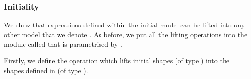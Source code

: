 \subsubsection{Initiality\label{sec:initiality}}
We show that expressions defined within the initial model can be lifted into
any other model that we denote . As before, we put all the lifting
operations into the module called  that is parametrised by .

Firstly, we define the operation  which lifts initial shapes (of type
) into the shapes defined in  (of type ).
\begin{AgdaSuppressSpace}
\begin{code}%
\>[0]\AgdaSpace{}%
\AgdaSpace{}%
\AgdaSymbol{(}\AgdaSpace{}%
\AgdaSymbol{:}\AgdaSpace{}%
\AgdaSymbol{)}\AgdaSpace{}%
\<%
\end{code}
\begin{code}[hide]%
\>[0][@{}l@{\AgdaIndent{1}}]%
\>[2]\AgdaSpace{}%
\AgdaSpace{}%
\AgdaSymbol{;}\AgdaSpace{}%
\AgdaSpace{}%
\AgdaSpace{}%
\<%
\\
%
\\[\AgdaEmptyExtraSkip]%
%
\>[2]\AgdaSpace{}%
\<%
\\
\>[2][@{}l@{\AgdaIndent{0}}]%
\>[4]\AgdaSpace{}%
\AgdaSymbol{:}\AgdaSpace{}%
\<%
\end{code}
\begin{mathpar}
\end{mathpar}
\end{AgdaSuppressSpace}
